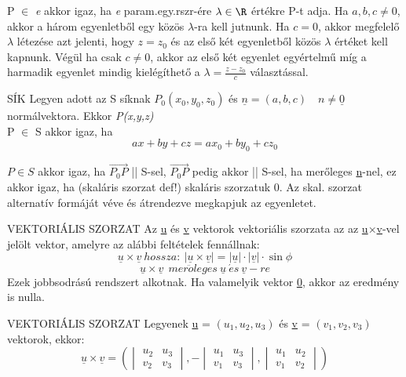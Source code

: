 \begin{bizonyitas}{}
P $\in$ \textit{e} akkor igaz, ha \textit{e} param.egy.rszr-ére $\lambda \in \R$ értékre P-t adja. Ha $a,b,c \neq 0$, akkor a három egyenletből egy közös $\lambda$-ra kell jutnunk. Ha $c=0$, akkor megfelelő $\lambda$ létezése azt jelenti, hogy $z=z_0$ és az első két egyenletből közös $\lambda$ értéket kell kapnunk. Végül ha csak $c\neq0$, akkor az első két egyenlet egyértelmű míg a harmadik egyenlet mindig kielégíthető a $\lambda = \frac{z-z_0}{c}$ választással.
\end{bizonyitas}

\begin{tetel}{SÍK}
Legyen adott az S síknak $P_0(x_0,y_0,z_0)$ és $\underline{n} = (a,b,c)\quad n\neq \underline{0}$ normálvektora. Ekkor \textit{P(x,y,z)}\\ P $\in$ S akkor igaz, ha
$$ax+by+cz=ax_0+by_0+cz_0$$
\end{tetel}

\begin{bizonyitas}{}
$P \in S$ akkor igaz, ha $\vec{P_0P}$ || S-sel, $\vec{P_0P}$ pedig akkor || S-sel, ha merőleges \underline{n}-nel, ez akkor igaz, ha (skaláris szorzat def!) skaláris szorzatuk 0. Az skal. szorzat alternatív formáját véve és átrendezve megkapjuk az egyenletet.
\end{bizonyitas}

\begin{definicio}{VEKTORIÁLIS SZORZAT}
Az \underline{u} és \underline{v} vektorok vektoriális szorzata az az \underline{u}×\underline{v}-vel jelölt
vektor, amelyre az alábbi feltételek fennállnak:
$$\underline{u} \times \underline{v}\: hossza:\: |\underline{u} \times \underline{v}| = |\underline{u}| \cdot |\underline{v}| \cdot\sin\phi$$
$$\underline{u} \times \underline{v}\ \: mer\ddot{o}leges\: \underline{u}\: \acute{e}s\: \underline{v}-re$$
Ezek jobbsodrású rendszert alkotnak. Ha valamelyik vektor \underline{0}, akkor az eredmény is nulla.
\end{definicio}

\begin{tetel}{VEKTORIÁLIS SZORZAT}
Legyenek \underline{u} = $(u_1,u_2,u_3)$ és \underline{v} = $(v_1,v_2,v_3)$ vektorok, ekkor:
$$\underline{u}\times\underline{v} = \left( \begin{vmatrix}
u_2&u_3\\v_2&v_3\end{vmatrix},-\begin{vmatrix}
u_1&u_3\\v_1&v_3\end{vmatrix},\begin{vmatrix}
u_1&u_2\\v_1&v_2\end{vmatrix} \right)$$
\end{tetel}

